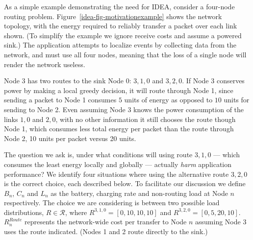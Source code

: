As a simple example demonstrating the need for IDEA, consider a four-node
routing problem.  Figure~\ref{idea-fig-motivationexample} shows the network
topology, with the energy required to reliably transfer a packet over each
link shown. (To simplify the example we ignore receive costs and assume a
powered sink.) The application attempts to localize events by collecting data
from the network, and must use all four nodes, meaning that the loss of a
single node will render the network useless.

Node 3 has two routes to the sink Node 0: $3,1,0$ and $3,2,0$. If Node 3
conserves power by making a local greedy decision, it will route through Node
1, since sending a packet to Node 1 consumes $5$ units of energy as opposed
to $10$ units for sending to Node 2. Even assuming Node 3 knows the power
consumption of the links $1,0$ and $2,0$, with no other information it still
chooses the route though Node 1, which consumes less total energy per packet
than the route through Node 2, 10 units per packet versus 20 units.

The question we ask is, under what conditions will using route $3,1,0$ ---
which consumes the least energy locally and globally --- actually
\textit{harm} application performance?  We identify four situations where
using the alternative route $3,2,0$ is the correct choice, each described
below. To facilitate our discussion we define $B_n$, $C_n$ and $L_n$ as the
battery, charging rate and non-routing load at Node $n$ respectively. The
choice we are considering is between two possible load distributions, $R \in
\mathcal{R}$, where $R^{3,1,0} = [0, 10, 10, 10]$ and $R^{3,2,0} = [0, 5, 20,
10]$.  $R^{Route}_n$ represents the network-wide cost per transfer to Node
$n$ assuming Node 3 uses the route indicated.  (Nodes 1 and 2 route directly
to the sink.)

